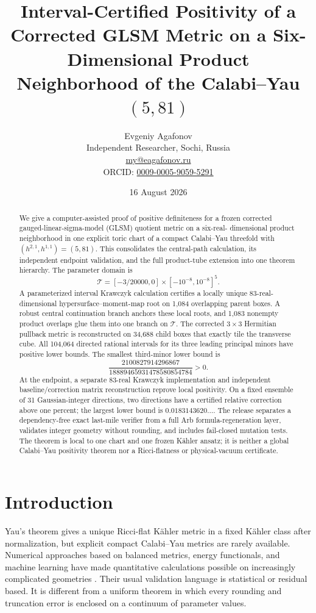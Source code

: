 \documentclass[11pt]{article}
\title{Interval-Certified Positivity of a Corrected GLSM Metric on a
Six-Dimensional Product Neighborhood of the Calabi--Yau $(5,81)$}
\author{Evgeniy Agafonov\\
\small Independent Researcher, Sochi, Russia\\
\small \href{mailto:my@eagafonov.ru}{my@eagafonov.ru}\\
\small ORCID: \href{https://orcid.org/0009-0005-9059-5291}{0009-0005-9059-5291}}
\date{16 August 2026}
\newcommand{\TT}{\mathcal{T}}
\begin{document}
\maketitle

\begin{abstract}
We give a computer-assisted proof of positive definiteness for a frozen
corrected gauged-linear-sigma-model (GLSM) quotient metric on a six-real-
dimensional product neighborhood in one explicit toric chart of a compact
Calabi--Yau threefold with $(h^{2,1},h^{1,1})=(5,81)$.  This consolidates the
central-path calculation, its independent endpoint validation, and the full
product-tube extension into one theorem hierarchy.  The parameter domain is
\[
 \TT=[-3/20000,0]\times[-10^{-8},10^{-8}]^5.
\]
A parameterized interval Krawczyk calculation certifies a locally unique
83-real-dimensional hypersurface--moment-map root on 1,084 overlapping parent
boxes.  A robust central continuation branch anchors these local roots, and
1,083 nonempty product overlaps glue them into one branch on $\TT$.  The
corrected $3\times3$ Hermitian pullback metric is reconstructed on 34,688
child boxes that exactly tile the transverse cube.  All 104,064 directed
rational intervals for its three leading principal minors have positive lower
bounds.  The smallest third-minor lower bound is
\[
 \frac{2100827914296867}{18889465931478580854784}>0.
\]
At the endpoint, a separate 83-real Krawczyk implementation and independent
baseline/correction matrix reconstruction reprove local positivity.  On a
fixed ensemble of 31 Gaussian-integer directions, two directions have a
certified relative correction above one percent; the largest lower bound is
$0.0183143620\ldots$.
The release separates a dependency-free exact last-mile verifier from a full
Arb formula-regeneration layer, validates integer geometry without rounding,
and includes fail-closed mutation tests.  The theorem is local to one chart
and one frozen K\"ahler ansatz; it is neither a global Calabi--Yau positivity
theorem nor a Ricci-flatness or physical-vacuum certificate.
\end{abstract}

\section{Introduction}

Yau's theorem gives a unique Ricci-flat K\"ahler metric in a fixed K\"ahler
class after normalization, but explicit compact Calabi--Yau metrics are rarely
available.  Numerical approaches based on balanced metrics, energy
functionals, and machine learning have made quantitative calculations
possible on increasingly complicated geometries
\cite{Donaldson2005,Douglas2008,Braun2008,Headrick2013,Ashmore2020,Anderson2021,Larfors2022}.
Their usual validation language is statistical or residual based.  It is
different from a uniform theorem in which every rounding and truncation error
is enclosed on a continuum of parameter values.
\end{document}
